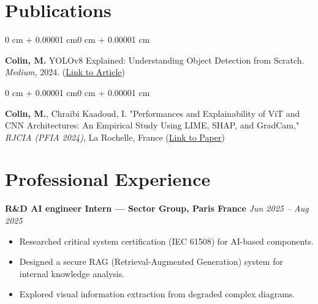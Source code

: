 \documentclass[10pt, letterpaper]{article}
\newenvironment{onecolentry}{
    \begin{adjustwidth}{0 cm + 0.00001 cm}{0 cm + 0.00001 cm}
}{
    \end{adjustwidth}
}
\begin{document}
\section{Publications}
   \vspace{0.1 cm}
    \begin{onecolentry}
        \textbf{Colin, M.} YOLOv8 Explained: Understanding Object Detection from Scratch. \textit{Medium}, 2024. (\href{https://medium.com/@melissa.colin/yolov8-explained-understanding-object-detection-from-scratch-763479652312}{Link to Article})
    \end{onecolentry}
    \vspace{0.1 cm}
   \begin{onecolentry}
     \textbf{Colin, M.}, Chraibi Kaadoud, I. "Performances and Explainability of ViT and CNN Architectures: An Empirical Study Using LIME, SHAP, and GradCam," \textit{RJCIA (PFIA 2024)}, La Rochelle, France (\href{https://medium.com/@melissa.colin/yolov8-explained-understanding-object-detection-from-scratch-763479652312}{Link to Paper})
 \end{onecolentry}


\vspace{0.3cm}
\section*{Professional Experience}
\textbf{R\&D AI engineer Intern — Sector Group, Paris France} \hfill \textit{Jun 2025 – Aug 2025}
\begin{itemize}[topsep=0pt, partopsep=0pt, itemsep=1.5pt, parsep=0pt]
    \item Researched critical system certification (IEC 61508) for AI-based components.
    \item Designed a secure RAG (Retrieval-Augmented Generation) system for internal knowledge analysis.
    \item Explored visual information extraction from degraded complex diagrams.
\end{itemize}
\vspace{0.3cm}
\end{document}
